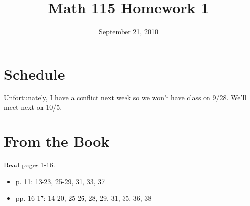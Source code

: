 \documentclass[fleqn,addpoints]{exam}
\title{Math 115 Homework 1}
\date{September 21, 2010}
\begin{document}

\maketitle

\ifprintanswers
\else
\section{Schedule}

Unfortunately, I have a conflict next week so we won't have class on 9/28.  We'll meet next on 10/5.

\fi

\section{From the Book}

Read pages 1-16.
 
\begin{itemize}
  \item p. 11: 13-23, 25-29, 31, 33, 37
  \item pp. 16-17: 14-20, 25-26, 28, 29, 31, 35, 36, 38
\end{itemize}

\ifprintanswers
\end{document}
